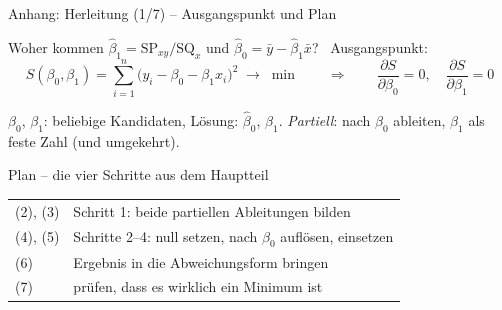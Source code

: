 \documentclass[aspectratio=169,11pt]{beamer}
\newcommand{\SQx}{\text{SQ}_x}
\newcommand{\SPxy}{\text{SP}_{xy}}
\begin{document}
\begin{frame}[label=herleitung]{Anhang: Herleitung (1/7) -- Ausgangspunkt und Plan}
  \begin{block}{Woher kommen $\hat{\beta}_1 = \SPxy / \SQx$ und $\hat{\beta}_0 = \bar{y} - \hat{\beta}_1\bar{x}$? \ Ausgangspunkt:}
    \[
      S(\beta_0,\beta_1) = \sum_{i=1}^{n}\bigl(y_i - \beta_0 - \beta_1 x_i\bigr)^{2} \;\to\; \min
      \qquad\Longrightarrow\qquad
      \frac{\partial S}{\partial \beta_0} = 0, \quad \frac{\partial S}{\partial \beta_1} = 0
    \]
    \vspace{-8pt}

    \footnotesize $\beta_0$, $\beta_1$: beliebige Kandidaten, Lösung: $\hat{\beta}_0$, $\hat{\beta}_1$.
    \emph{Partiell}: nach $\beta_0$ ableiten, $\beta_1$ als feste Zahl (und umgekehrt).
  \end{block}

  \begin{exampleblock}{Plan -- die vier Schritte aus dem Hauptteil}
    \footnotesize
    \begin{tabular}{@{}ll@{}}
      (2), (3) & Schritt 1: beide partiellen Ableitungen bilden \\
      (4), (5) & Schritte 2--4: null setzen, nach $\beta_0$ auflösen, einsetzen \\
      (6)      & Ergebnis in die Abweichungsform bringen \\
      (7)      & prüfen, dass es wirklich ein Minimum ist
    \end{tabular}
  \end{exampleblock}
  \hfill\hyperlink{loesungsweg}{}
\end{frame}
\end{document}
